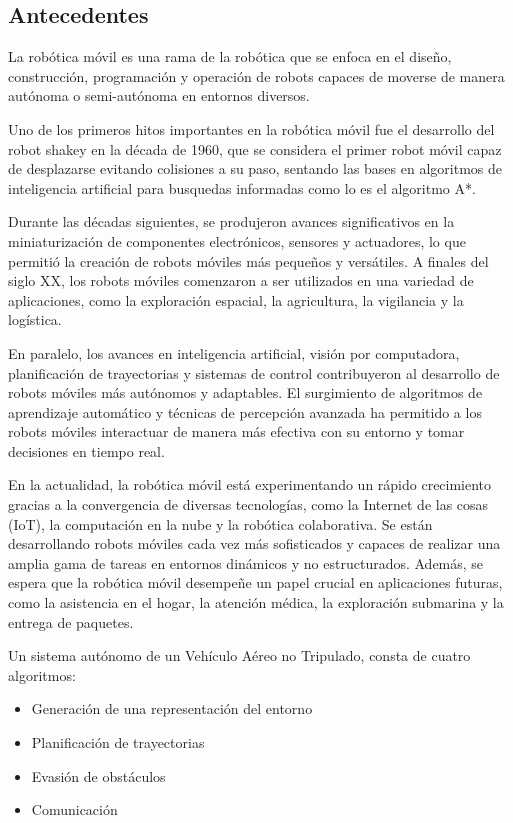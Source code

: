 \subsection*{Antecedentes}

La robótica móvil es una rama de la robótica que se enfoca en el diseño, construcción, programación y operación de robots capaces de moverse de manera autónoma o semi-autónoma en entornos diversos. 

Uno de los primeros hitos importantes en la robótica móvil fue el desarrollo del robot shakey en la década de 1960, que se considera el primer robot móvil capaz de desplazarse evitando colisiones a su paso, sentando las bases en algoritmos de inteligencia artificial para busquedas informadas como lo es el algoritmo A*. 

Durante las décadas siguientes, se produjeron avances significativos en la miniaturización de componentes electrónicos, sensores y actuadores, lo que permitió la creación de robots móviles más pequeños y versátiles. A finales del siglo XX, los robots móviles comenzaron a ser utilizados en una variedad de aplicaciones, como la exploración espacial, la agricultura, la vigilancia y la logística.

En paralelo, los avances en inteligencia artificial, visión por computadora, planificación de trayectorias y sistemas de control contribuyeron al desarrollo de robots móviles más autónomos y adaptables. El surgimiento de algoritmos de aprendizaje automático y técnicas de percepción avanzada ha permitido a los robots móviles interactuar de manera más efectiva con su entorno y tomar decisiones en tiempo real.

En la actualidad, la robótica móvil está experimentando un rápido crecimiento gracias a la convergencia de diversas tecnologías, como la Internet de las cosas (IoT), la computación en la nube y la robótica colaborativa. Se están desarrollando robots móviles cada vez más sofisticados y capaces de realizar una amplia gama de tareas en entornos dinámicos y no estructurados. Además, se espera que la robótica móvil desempeñe un papel crucial en aplicaciones futuras, como la asistencia en el hogar, la atención médica, la exploración submarina y la entrega de paquetes.

Un sistema autónomo de un Vehículo Aéreo no Tripulado, consta de cuatro algoritmos:
\begin{itemize}\setlength{\itemsep}{-1mm}
\item Generación de una representación del entorno
\item Planificación de trayectorias
\item Evasión de obstáculos
\item Comunicación
\end{itemize}

